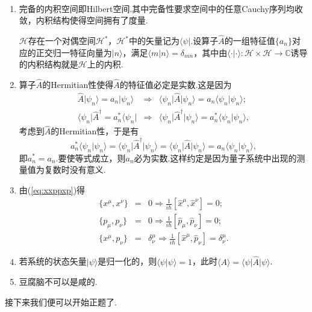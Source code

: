		\begin{remark}\ 
			\begin{enumerate}
				\item 完备的内积空间即Hilbert空间.其中完备性要求空间中的任意Cauchy序列均收敛，内积结构使得空间拥有了度量.
				
				$\mathcal{H}$存在一个对偶空间$\mathcal{H}^*$，$\mathcal{H}^*$中的矢量记为$\langle\psi\vert$.设算子$\hat{A}$的一组特征值$\{a_n\}$对应的正交归一特征向量为$\vert n\rangle $，满足$\langle m\vert n\rangle=\delta_{mn}$，其中由$\langle\cdot \vert\cdot\rangle:\mathcal{H}\times \mathcal{H}\rightarrow \mathbb{C} $诱导的内积结构就是$\mathcal{H}$上的内积.
				\item 算子$\hat{A}$的Hermitian性使得$\hat{A}$的特征值必定是实数.这是因为
				\begin{eqnarray*}
					\hat{A}\vert\psi_n\rangle=a_n\vert\psi_n\rangle&\Rightarrow&\langle\psi_n\vert\hat{A}\vert\psi_n\rangle=a_n\langle\psi_n\vert\psi_n\rangle;\\
					\langle\psi_n\vert\hat{A}^\dagger=a^*_n\langle\psi_n\vert&\Rightarrow&\langle\psi_n\vert\hat{A}^\dagger\vert\psi_n\rangle=a^*_n\langle\psi_n\vert\psi_n\rangle,
				\end{eqnarray*}
				考虑到$\hat{A}$的Hermitian性，于是有
				$$a^*_n\langle\psi_n\vert\psi_n\rangle=\langle\psi_n\vert\hat{A}^\dagger\vert\psi_n\rangle=\langle\psi_n\vert\hat{A}\vert\psi_n\rangle=a_n\langle\psi_n\vert\psi_n\rangle,$$
				即$a^*_n=a_n$.要使等式成立，则$a_n$必为实数.这样约定是因为量子系统中出现的测量值为复数时没有意义.
				\item 由(\ref{eq:xxppxp})得
				\begin{eqnarray*}
					\{x^\mu,x^\nu\}&=&0\Rightarrow\frac{1}{i\hbar}[\hat{x}^\mu,\hat{x}^\nu]=0;\\
					\{p_\mu,p_\nu\}&=&0\Rightarrow\frac{1}{i\hbar}[\hat{p}_\mu,\hat{p}_\nu]=0;\\
					\{x^\mu,p_\nu\}&=&\delta^\mu_\nu\Rightarrow\frac{1}{i\hbar}[\hat{x}^\mu,\hat{p}_\nu]=\delta^\mu_\nu.
				\end{eqnarray*}
				\item 若系统的状态矢量$\vert\psi\rangle$是归一化的，则$\langle\psi\vert\psi\rangle=1$，此时$\langle A\rangle =\langle\psi\vert\hat{A}\vert\psi\rangle$.
				\item 豆腐脑不可以是咸的.
			\end{enumerate}
		\end{remark}

		接下来我们便可以开始正题了.
